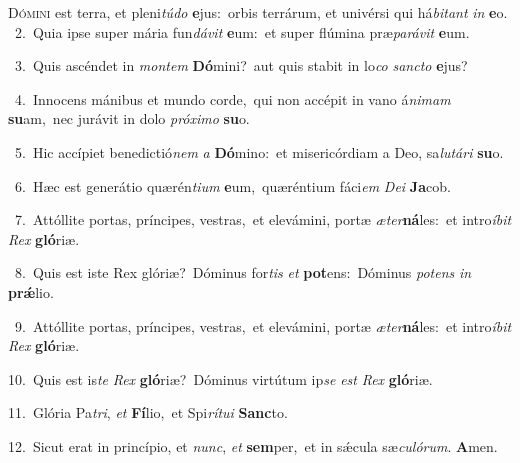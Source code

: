 \lettrine{\initial\textcolor{\initialcolor}{D}}{ómini} est terra, et pleni\-\textit{tú}\-\textit{do} \textbf{e}\-jus:~\star orbis terrárum, et univérsi qui há\-\textit{bi}\-\textit{tant} \textit{in} \textbf{e}\-o.\\
{\numbfont\textcolor{\numbcolor}{~2.}}~Quia ipse super mária fun\-\textit{dá}\-\textit{vit} \textbf{e}\-um:~\star et super flúmina præ\-\textit{pa}\-\textit{rá}\textit{vit} \textbf{e}\-um.\par
{\numbfont\textcolor{\numbcolor}{~3.}}~Quis ascéndet in \textit{mon}\-\textit{tem} \textbf{Dó}\-mini?~\star aut quis stabit in lo\textit{co} \textit{sanc}\-\textit{to} \textbf{e}\-jus?\par
{\numbfont\textcolor{\numbcolor}{~4.}}~Innocens mánibus et mundo corde,~\dagger qui non accépit in vano á\-\textit{ni}\-\textit{mam} \textbf{su}\-am,~\star nec jurávit in dolo \textit{pró}\-\textit{xi}\textit{mo} \textbf{su}\-o.\par
{\numbfont\textcolor{\numbcolor}{~5.}}~Hic accípiet benedictió\textit{nem} \textit{a} \textbf{Dó}\-mino:~\star et misericórdiam a Deo, sa\-\textit{lu}\-\textit{tá}\textit{ri} \textbf{su}\-o.\par
{\numbfont\textcolor{\numbcolor}{~6.}}~Hæc est generátio quærén\-\textit{ti}\-\textit{um} \textbf{e}\-um,~\star quæréntium fáci\textit{em} \textit{De}\-\textit{i} \textbf{Ja}\-cob.\par
{\numbfont\textcolor{\numbcolor}{~7.}}~Attóllite portas, príncipes, vestras,~\dagger et elevámini, portæ \textit{æ}\-\textit{ter}\textbf{ná}les:~\star et intro\-\textit{í}\-\textit{bit} \textit{Rex} \textbf{gló}\-riæ.\par
{\numbfont\textcolor{\numbcolor}{~8.}}~Quis est iste Rex glóriæ?~\dagger Dóminus for\textit{tis} \textit{et} \textbf{pot}\-ens:~\star Dóminus \textit{pot}\-\textit{ens} \textit{in} \textbf{prǽ}\-lio.\par
{\numbfont\textcolor{\numbcolor}{~9.}}~Attóllite portas, príncipes, vestras,~\dagger et elevámini, portæ \textit{æ}\-\textit{ter}\textbf{ná}les:~\star et intro\-\textit{í}\-\textit{bit} \textit{Rex} \textbf{gló}\-riæ.\par
{\numbfont\textcolor{\numbcolor}{10.}}~Quis est is\textit{te} \textit{Rex} \textbf{gló}\-riæ?~\star Dóminus virtútum ip\textit{se} \textit{est} \textit{Rex} \textbf{gló}\-riæ.\par
{\numbfont\textcolor{\numbcolor}{11.}}~Glória Pa\-\textit{tri}\-, \textit{et} \textbf{Fí}\-lio,~\star et Spi\-\textit{rí}\-\textit{tu}\textit{i} \textbf{Sanc}\-to.\par
{\numbfont\textcolor{\numbcolor}{12.}}~Sicut erat in princípio, et \textit{nunc}\-, \textit{et} \textbf{sem}\-per,~\star et in sǽcula sæ\-\textit{cu}\-\textit{ló}\textit{rum}. \textbf{A}\-men.\par
